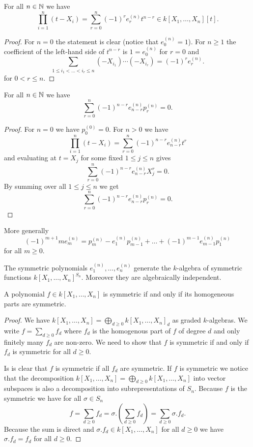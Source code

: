 \begin{lem}
 For all $n \in \mathbb{N}$ we have
 \[
  \prod_{i=1}^n (t-X_i) = \sum_{r=0}^n (-1)^r e_r^{(n)} t^{n-r} \in k[X_1, \ldots, X_n][t].
 \]
\end{lem}
\begin{proof}
 For $n = 0$ the statement is clear (notice that $e_0^{(n)} = 1$). For $n \geq 1$ the coefficient of the left-hand side of $t^{n-r}$ is $1 = e^{(n)}_0$ for $r = 0$ and
 \[
  \sum_{1 \leq i_1 < \ldots < i_r \leq n} (-X_{i_1}) \cdots (-X_{i_r}) = (-1)^r e^{(n)}_r.
 \]
 for $0 < r \leq n$.
\end{proof}


\begin{cor}
 For all $n \in \mathbb{N}$ we have
 \[
  \sum_{r=0}^n (-1)^{n-r} e_{n-r}^{(n)} p_r^{(n)} = 0.
 \]
\end{cor}
\begin{proof}
 For $n = 0$ we have $p_0^{(0)} = 0$. For $n > 0$ we have
 \[
  \prod_{i=1}^n (t-X_i) = \sum_{r=0}^n (-1)^{n-r} e^{(n)}_{n-r} t^r
 \]
 and evaluating at $t = X_j$ for some fixed $1 \leq j \leq n$ gives
 \[
  \sum_{r=0}^n (-1)^{n-r} e^{(n)}_{n-r} X_j^r = 0.
 \]
 By summing over all $1 \leq j \leq n$ we get
 \[
  \sum_{r=0}^n (-1)^{n-r} e^{(n)}_{n-r} p^{(n)}_r = 0.
 \]
\end{proof}


\begin{rem}
 More generally
 \[
  (-1)^{m+1} m e^{(n)}_m = p^{(n)}_m - e^{(n)}_1 p^{(n)}_{m-1} + \ldots + (-1)^{m-1} e^{(n)}_{m-1} p^{(n)}_1
 \]
 for all $m \geq 0$.
\end{rem}


\begin{thrm}
 The symmetric polynomials $e^{(n)}_1, \ldots, e^{(n)}_n$ generate the $k$-algebra of symmetric functions $k[X_1, \ldots, X_n]^{S_n}$. Moreover they are algebraically independent.
\end{thrm}


\begin{lem}
 A polynomial $f \in k[X_1, \ldots, X_n]$ is symmetric if and only if its homogeneous parts are symmetric.
\end{lem}
\begin{proof}
 We have $k[X_1, \ldots, X_n] = \bigoplus_{d \geq 0} k[X_1, \ldots, X_n]_d$ as graded $k$-algebras. We write $f = \sum_{d \geq 0} f_d$ where $f_d$ is the homogenous part of $f$ of degree $d$ and only finitely many $f_d$ are non-zero. We need to show that $f$ is symmetric if and only if $f_d$ is symmetric for all $d \geq 0$.
 
 Is is clear that $f$ is symmetric if all $f_d$ are symmetric. If $f$ is symmetric we notice that the decomposition $k[X_1, \ldots, X_n] = \bigoplus_{d \geq 0} k[X_1, \ldots, X_n]$ into vector subspaces is also a decomposition into subrepresentations of $S_n$. Because $f$ is the symmetric we have for all $\sigma \in S_n$
 \[
  f = \sum_{d \geq 0} f_d = \sigma.\left( \sum_{d \geq 0} f_d \right) = \sum_{d \geq 0} \sigma.f_d.
 \]
 Because the sum is direct and $\sigma.f_d \in k[X_1, \ldots, X_n]$ for all $d \geq 0$ we have $\sigma.f_d = f_d$ for all $d \geq 0$.
\end{proof}


